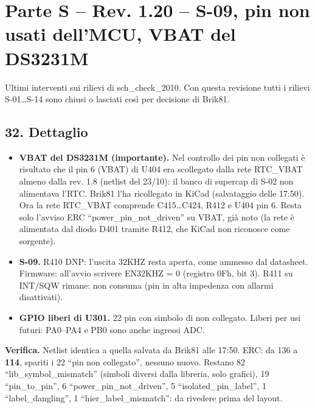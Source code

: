 \clearpage
\section[Parte S – Rev. 1.20 – S-09, pin non usati dell'MCU, VBAT del DS3231M]{Parte S – Rev. 1.20 – S-09, pin non usati dell'MCU, VBAT del DS3231M}

Ultimi interventi sui rilievi di sch\_\allowbreak{}check\_\allowbreak{}2010. Con questa revisione tutti i rilievi S-01…S-14 sono chiusi o lasciati così per decisione di Brik81.

\subsection[32. Dettaglio]{32. Dettaglio}

\begin{itemize}
\item \textbf{VBAT del DS3231M (importante).} Nel controllo dei pin non collegati è risultato che il pin 6 (VBAT) di U404 era scollegato dalla rete RTC\_\allowbreak{}VBAT almeno dalla rev. 1.8 (netlist del 23/\allowbreak{}10): il banco di supercap di S-02 non alimentava l'RTC. Brik81 l'ha ricollegato in KiCad (salvataggio delle 17:50). Ora la rete RTC\_\allowbreak{}VBAT comprende C415…C424, R412 e U404 pin 6. Resta solo l'avviso ERC \textquotedblleft{}power\_\allowbreak{}pin\_\allowbreak{}not\_\allowbreak{}driven\textquotedblright{} su VBAT, già noto (la rete è alimentata dal diodo D401 tramite R412, che KiCad non riconosce come sorgente).
\item \textbf{S-09.} R410 DNP: l'uscita 32KHZ resta aperta, come ammesso dal datasheet. Firmware: all'avvio scrivere EN32KHZ = 0 (registro 0Fh, bit 3). R411 su INT/\allowbreak{}SQW rimane: non consuma (pin in alta impedenza con allarmi disattivati).
\item \textbf{GPIO liberi di U301.} 22 pin con simbolo di non collegato. Liberi per usi futuri: PA0–PA4 e PB0 sono anche ingressi ADC.
\end{itemize}

\textbf{Verifica.} Netlist identica a quella salvata da Brik81 alle 17:50. ERC: da 136 a \textbf{114}, spariti i 22 \textquotedblleft{}pin non collegato\textquotedblright{}, nessuno nuovo. Restano 82 \textquotedblleft{}lib\_\allowbreak{}symbol\_\allowbreak{}mismatch\textquotedblright{} (simboli diversi dalla libreria, solo grafici), 19 \textquotedblleft{}pin\_\allowbreak{}to\_\allowbreak{}pin\textquotedblright{}, 6 \textquotedblleft{}power\_\allowbreak{}pin\_\allowbreak{}not\_\allowbreak{}driven\textquotedblright{}, 5 \textquotedblleft{}isolated\_\allowbreak{}pin\_\allowbreak{}label\textquotedblright{}, 1 \textquotedblleft{}label\_\allowbreak{}dangling\textquotedblright{}, 1 \textquotedblleft{}hier\_\allowbreak{}label\_\allowbreak{}mismatch\textquotedblright{}: da rivedere prima del layout.
